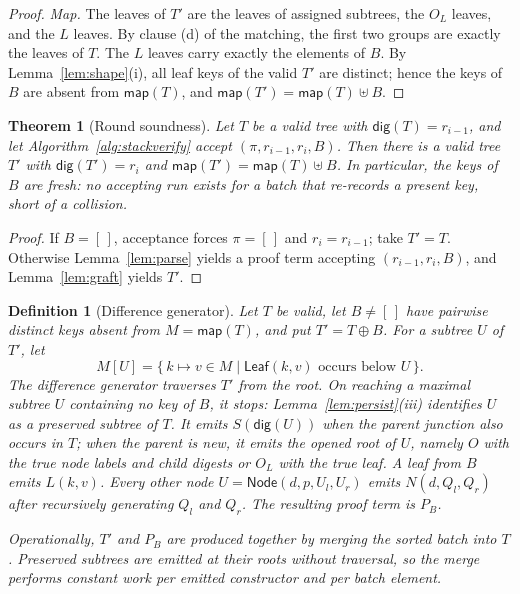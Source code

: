 \documentclass[twocolumn]{article}
\newtheorem{definition}{Definition}
\newtheorem{theorem}{Theorem}
\begin{document}
\begin{proof}
\emph{Map.} The leaves of $T'$ are the leaves of assigned subtrees, the $O_L$ leaves, and the $L$ leaves. By clause (d) of the matching, the first two groups are exactly the leaves of $T$. The $L$ leaves carry exactly the elements of $B$. By Lemma~\ref{lem:shape}(i), all leaf keys of the valid $T'$ are distinct; hence the keys of $B$ are absent from $\mathsf{map}(T)$, and $\mathsf{map}(T') = \mathsf{map}(T) \uplus B$.
\end{proof}

\begin{theorem}[Round soundness]
\label{thm:round}
Let $T$ be a valid tree with $\mathsf{dig}(T) = r_{i-1}$, and let Algorithm~\ref{alg:stackverify} accept $(\pi, r_{i-1}, r_i, B)$. Then there is a valid tree $T'$ with $\mathsf{dig}(T') = r_i$ and $\mathsf{map}(T') = \mathsf{map}(T) \uplus B$. In particular, the keys of $B$ are fresh: no accepting run exists for a batch that re-records a present key, short of a collision.
\end{theorem}
\begin{proof}
If $B = [\,]$, acceptance forces $\pi = [\,]$ and $r_i = r_{i-1}$; take $T' = T$. Otherwise Lemma~\ref{lem:parse} yields a proof term accepting $(r_{i-1}, r_i, B)$, and Lemma~\ref{lem:graft} yields $T'$.
\end{proof}

\begin{definition}[Difference generator]
\label{def:generator}
Let $T$ be valid, let $B \neq [\,]$ have pairwise distinct keys absent from $M=\mathsf{map}(T)$, and put $T'=T\oplus B$. For a subtree $U$ of $T'$, let
\[
  M[U] = \{\,k \mapsto v \in M \mid \mathsf{Leaf}(k,v)\text{ occurs below }U\,\}.
\]
The difference generator traverses $T'$ from the root. On reaching a maximal subtree $U$ containing no key of $B$, it stops: Lemma~\ref{lem:persist}(iii) identifies $U$ as a preserved subtree of $T$. It emits $S(\mathsf{dig}(U))$ when the parent junction also occurs in $T$; when the parent is new, it emits the opened root of $U$, namely $O$ with the true node labels and child digests or $O_L$ with the true leaf. A leaf from $B$ emits $L(k,v)$. Every other node $U=\mathsf{Node}(d,p,U_l,U_r)$ emits $N(d,Q_l,Q_r)$ after recursively generating $Q_l$ and $Q_r$. The resulting proof term is $P_B$.

Operationally, $T'$ and $P_B$ are produced together by merging the sorted batch into $T$. Preserved subtrees are emitted at their roots without traversal, so the merge performs constant work per emitted constructor and per batch element.
\end{definition}
\end{document}
